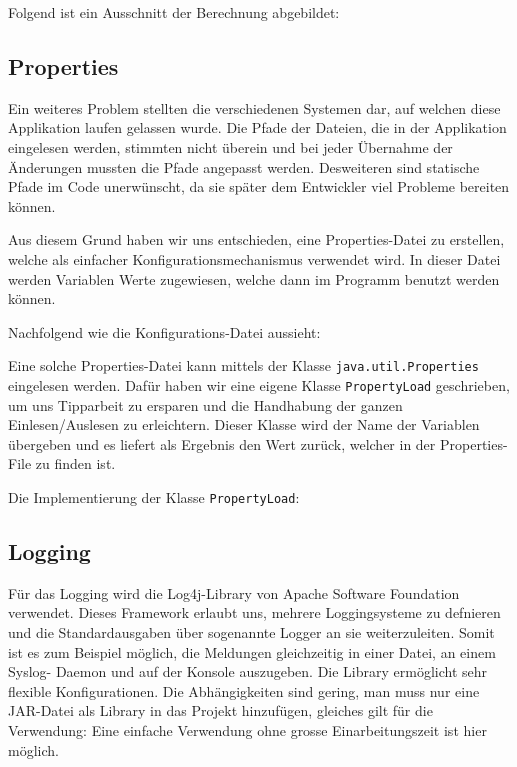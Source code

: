 Folgend ist ein Ausschnitt der Berechnung abgebildet:



\subsection{Properties}
Ein weiteres Problem stellten die verschiedenen Systemen dar, auf welchen
diese Applikation laufen gelassen wurde. Die Pfade der Dateien, die in der
Applikation eingelesen werden, stimmten nicht überein und bei jeder Übernahme
der Änderungen mussten die Pfade angepasst werden. Desweiteren sind statische
Pfade im Code unerwünscht, da sie später dem Entwickler viel Probleme bereiten
können. 

Aus diesem Grund haben wir uns entschieden, eine Properties-Datei zu
erstellen, welche als einfacher Konfigurationsmechanismus verwendet wird. In
dieser Datei werden Variablen Werte zugewiesen, welche dann im Programm
benutzt werden können.

Nachfolgend wie die Konfigurations-Datei aussieht:



Eine solche Properties-Datei kann mittels der Klasse
\texttt{java.util.Properties} eingelesen werden. Dafür haben wir eine eigene
Klasse \texttt{PropertyLoad} geschrieben, um uns Tipparbeit zu ersparen und
die Handhabung der ganzen Einlesen/Auslesen zu erleichtern. Dieser Klasse wird
der Name der Variablen übergeben und es liefert als Ergebnis den Wert zurück,
welcher in der Properties-File zu finden ist.

Die Implementierung der Klasse \texttt{PropertyLoad}:



\subsection{Logging}
Für das Logging\cite{apachelog4j} wird die Log4j-Library von Apache Software Foundation
verwendet. Dieses Framework erlaubt uns, mehrere Loggingsysteme zu defnieren
und die Standardausgaben über sogenannte Logger an sie weiterzuleiten. Somit
ist es zum Beispiel möglich, die Meldungen gleichzeitig in einer Datei, an
einem Syslog- Daemon und auf der Konsole auszugeben. Die Library ermöglicht
sehr flexible Konfigurationen. Die Abhängigkeiten sind gering, man muss nur
eine JAR-Datei als Library in das Projekt hinzufügen, gleiches gilt für die
Verwendung: Eine einfache Verwendung ohne grosse Einarbeitungszeit ist hier
möglich.

